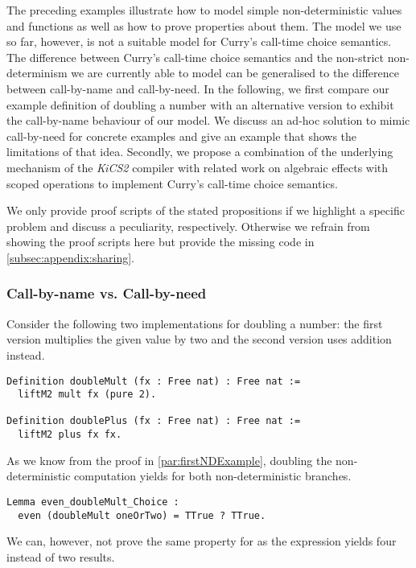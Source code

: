 The preceding examples illustrate how to model simple non\--deterministic values and functions as well as how to prove properties about them.
The model we use so far, however, is not a suitable model for Curry's call\--time choice semantics.
The difference between Curry's call\--time choice semantics and the non\--strict non\--determinism we are currently able to model can be generalised to the difference between call\--by\--name and call\--by\--need.
In the following, we first compare our example definition of doubling a number with an alternative version to exhibit the call\--by\--name behaviour of our model.
We discuss an ad\--hoc solution to mimic call\--by\--need for concrete examples and give an example that shows the limitations of that idea.
Secondly, we propose a combination of the underlying mechanism of the \emph{KiCS2} compiler with related work on algebraic effects with scoped operations to implement Curry's call\--time choice semantics.

We only provide proof scripts of the stated propositions if we highlight a specific problem and discuss a peculiarity, respectively.
Otherwise we refrain from showing the proof scripts here but provide the missing code in \autoref{subsec:appendix:sharing}.

\subsubsection{Call\--by\--name vs. Call\--by\--need}
\label{subsubsec:cbneed}
 
Consider the following two implementations for doubling a number: the first version multiplies the given value by two and the second version uses addition instead.

\begin{verbatim}
Definition doubleMult (fx : Free nat) : Free nat :=
  liftM2 mult fx (pure 2).

Definition doublePlus (fx : Free nat) : Free nat :=
  liftM2 plus fx fx.
\end{verbatim}

As we know from the proof in \autoref{par:firstNDExample}, doubling the non\--deterministic computation  yields  for both non\--deterministic branches.

\begin{verbatim}
Lemma even_doubleMult_Choice :
  even (doubleMult oneOrTwo) = TTrue ? TTrue.
\end{verbatim}

We can, however, not prove the same property for  as the expression yields four instead of two results.

